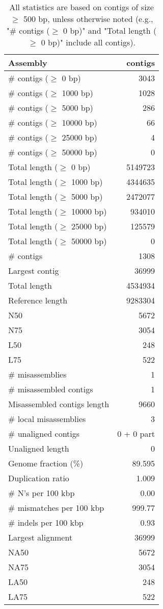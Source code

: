 \documentclass[12pt,a4paper]{article}
\begin{document}
\begin{table}[ht]
\begin{center}
\caption{All statistics are based on contigs of size $\geq$ 500 bp, unless otherwise noted (e.g., "\# contigs ($\geq$ 0 bp)" and "Total length ($\geq$ 0 bp)" include all contigs).}
\begin{tabular}{|l*{1}{|r}|}
\hline
Assembly & contigs \\ \hline
\# contigs ($\geq$ 0 bp) & 3043 \\ \hline
\# contigs ($\geq$ 1000 bp) & 1028 \\ \hline
\# contigs ($\geq$ 5000 bp) & 286 \\ \hline
\# contigs ($\geq$ 10000 bp) & 66 \\ \hline
\# contigs ($\geq$ 25000 bp) & 4 \\ \hline
\# contigs ($\geq$ 50000 bp) & 0 \\ \hline
Total length ($\geq$ 0 bp) & 5149723 \\ \hline
Total length ($\geq$ 1000 bp) & 4344635 \\ \hline
Total length ($\geq$ 5000 bp) & 2472077 \\ \hline
Total length ($\geq$ 10000 bp) & 934010 \\ \hline
Total length ($\geq$ 25000 bp) & 125579 \\ \hline
Total length ($\geq$ 50000 bp) & 0 \\ \hline
\# contigs & 1308 \\ \hline
Largest contig & 36999 \\ \hline
Total length & 4534934 \\ \hline
Reference length & 9283304 \\ \hline
N50 & 5672 \\ \hline
N75 & 3054 \\ \hline
L50 & 248 \\ \hline
L75 & 522 \\ \hline
\# misassemblies & 1 \\ \hline
\# misassembled contigs & 1 \\ \hline
Misassembled contigs length & 9660 \\ \hline
\# local misassemblies & 3 \\ \hline
\# unaligned contigs & 0 + 0 part \\ \hline
Unaligned length & 0 \\ \hline
Genome fraction (\%) & 89.595 \\ \hline
Duplication ratio & 1.009 \\ \hline
\# N's per 100 kbp & 0.00 \\ \hline
\# mismatches per 100 kbp & 999.77 \\ \hline
\# indels per 100 kbp & 0.93 \\ \hline
Largest alignment & 36999 \\ \hline
NA50 & 5672 \\ \hline
NA75 & 3054 \\ \hline
LA50 & 248 \\ \hline
LA75 & 522 \\ \hline
\end{tabular}
\end{center}
\end{table}
\end{document}
